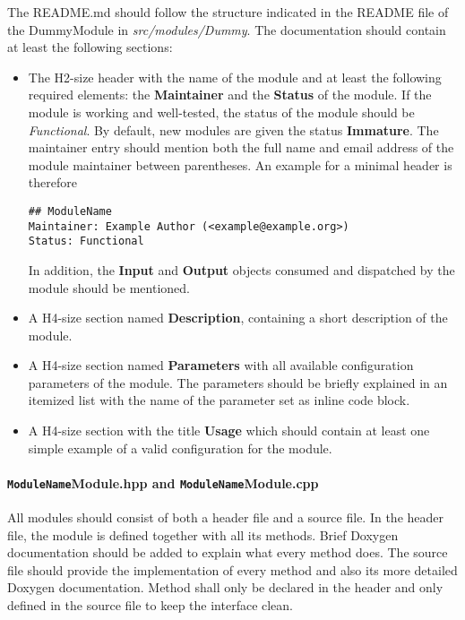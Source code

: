 The README.md should follow the structure indicated in the README file of the DummyModule in \textit{src/modules/Dummy}.
The documentation should contain at least the following sections:
\begin{itemize}
\item The H2-size header with the name of the module and at least the following required elements: the \textbf{Maintainer} and the \textbf{Status} of the module.
If the module is working and well-tested, the status of the module should be \textit{Functional}.
By default, new modules are given the status \textbf{Immature}.
The maintainer entry should mention both the full name and email address of the module maintainer between parentheses.
An example for a minimal header is therefore
\begin{verbatim}
## ModuleName
Maintainer: Example Author (<example@example.org>)
Status: Functional
\end{verbatim}
In addition, the \textbf{Input} and \textbf{Output} objects consumed and dispatched by the module should be mentioned.
\item A H4-size section named \textbf{Description}, containing a short description of the module.
\item A H4-size section named \textbf{Parameters} with all available configuration parameters of the module.
The parameters should be briefly explained in an itemized list with the name of the parameter set as inline code block.
\item A H4-size section with the title \textbf{Usage} which should contain at least one simple example of a valid configuration for the module.
\end{itemize}

\paragraph{\texttt{ModuleName}Module.hpp and \texttt{ModuleName}Module.cpp}
All modules should consist of both a header file and a source file.
In the header file, the module is defined together with all its methods.
Brief Doxygen documentation should be added to explain what every method does.
The source file should provide the implementation of every method and also its more detailed Doxygen documentation.
Method shall only be declared in the header and only defined in the source file to keep the interface clean.

